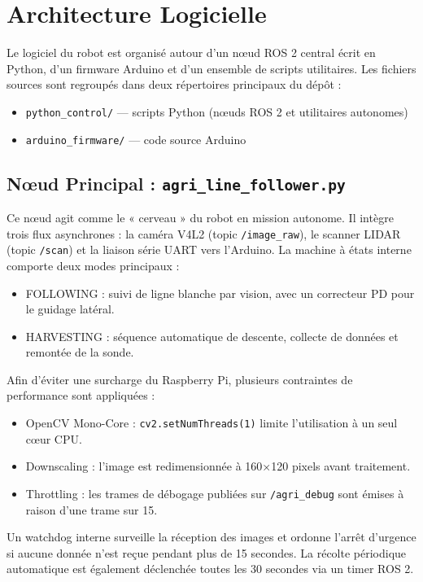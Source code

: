 \documentclass [12pt, a4paper]{article}
\begin{document}
\section{Architecture Logicielle}

Le logiciel du robot est organisé autour d'un nœud ROS 2 central écrit en Python, d'un firmware Arduino et d'un ensemble de scripts utilitaires. Les fichiers sources sont regroupés dans deux répertoires principaux du dépôt :
\begin{itemize}
    \item \texttt{python\_control/} — scripts Python (nœuds ROS 2 et utilitaires autonomes)
    \item \texttt{arduino\_firmware/} — code source Arduino
\end{itemize}

\subsection{Nœud Principal : \texttt{agri\_line\_follower.py}}
Ce nœud agit comme le « cerveau » du robot en mission autonome. Il intègre trois flux asynchrones : la caméra V4L2 (topic \texttt{/image\_raw}), le scanner LIDAR (topic \texttt{/scan}) et la liaison série UART vers l'Arduino. La machine à états interne comporte deux modes principaux :
\begin{itemize}
    \item FOLLOWING : suivi de ligne blanche par vision, avec un correcteur PD pour le guidage latéral.
    \item HARVESTING : séquence automatique de descente, collecte de données et remontée de la sonde.
\end{itemize}
Afin d'éviter une surcharge du Raspberry Pi, plusieurs contraintes de performance sont appliquées :
\begin{itemize}
    \item OpenCV Mono-Core : \texttt{cv2.setNumThreads(1)} limite l'utilisation à un seul cœur CPU.
    \item Downscaling : l'image est redimensionnée à 160×120 pixels avant traitement.
    \item Throttling : les trames de débogage publiées sur \texttt{/agri\_debug} sont émises à raison d'une trame sur 15.
\end{itemize}
Un watchdog interne surveille la réception des images et ordonne l'arrêt d'urgence si aucune donnée n'est reçue pendant plus de 15 secondes. La récolte périodique automatique est également déclenchée toutes les 30 secondes via un timer ROS 2.
\end{document}
